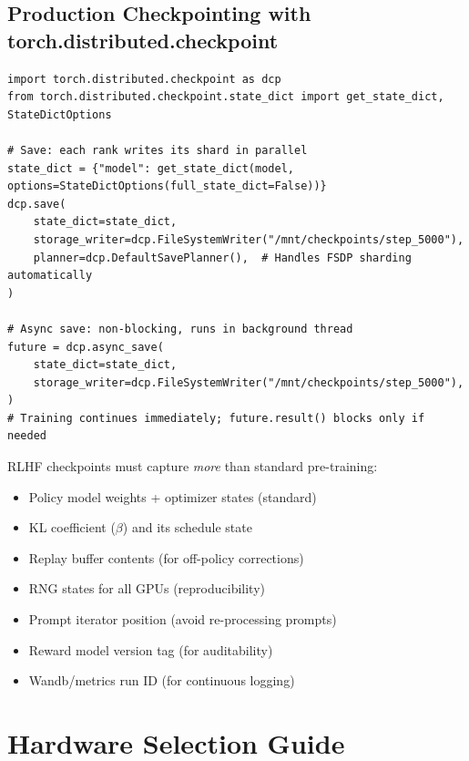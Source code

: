 \subsection{Production Checkpointing with torch.distributed.checkpoint}
\label{production-checkpointing-with-torch.distributed.checkpoint}

\begin{lstlisting}[style=pythonstyle]
import torch.distributed.checkpoint as dcp
from torch.distributed.checkpoint.state_dict import get_state_dict, StateDictOptions

# Save: each rank writes its shard in parallel
state_dict = {"model": get_state_dict(model, options=StateDictOptions(full_state_dict=False))}
dcp.save(
    state_dict=state_dict,
    storage_writer=dcp.FileSystemWriter("/mnt/checkpoints/step_5000"),
    planner=dcp.DefaultSavePlanner(),  # Handles FSDP sharding automatically
)

# Async save: non-blocking, runs in background thread
future = dcp.async_save(
    state_dict=state_dict,
    storage_writer=dcp.FileSystemWriter("/mnt/checkpoints/step_5000"),
)
# Training continues immediately; future.result() blocks only if needed
\end{lstlisting}

\begin{keybox}
RLHF checkpoints must capture \emph{more} than standard pre-training:

\begin{itemize}
  \item Policy model weights + optimizer states (standard)
  \item KL coefficient ($\beta$) and its schedule state
  \item Replay buffer contents (for off-policy corrections)
  \item RNG states for all GPUs (reproducibility)
  \item Prompt iterator position (avoid re-processing prompts)
  \item Reward model version tag (for auditability)
  \item Wandb/metrics run ID (for continuous logging)
\end{itemize}
\end{keybox}

\section{Hardware Selection Guide}
\label{sec:hardware-guide}

